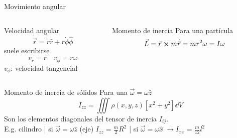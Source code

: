 \documentclass[serif]{beamer}
\begin{document}
\begin{frame}{Movimiento angular}
\begin{columns}[c]
	\begin{column}{0.45\textwidth}
		\begin{block}{Velocidad angular}
		\[
			\dot{\vec{r}} = \dot{r} \hat{r} + r \dot{\phi} \hat{\phi}
		\]
		suele escribirse
		\[ v_r = \dot{r} \quad v_\phi= r \omega \]
		\(v_\phi\): velocidad tangencial
		\end{block}
	\end{column}

	\pause

	\begin{column}{0.45\textwidth}
		\begin{block}{Momento de inercia}
			Para una partícula
			\[
				\vec{L}= \vec{r} \cp m \dot{\vec{r}} = m r^2 \omega= I \omega
			\]
		\end{block}
	\end{column}
\end{columns}
	
	\pause
	\begin{block}{Momento de inercia de sólidos}
		Para una \(\vec{\omega}= \omega \hat{z}\)
		\[
			I_{zz}= \iiint \rho(x,y,z) \left[ x^2+y^2 \right] \dd{V}
		\]
		Son los elementos diagonales del tensor de inercia \(I_{ij}\).\\
		\pause
		E.g. cilindro | si \(\vec{\omega}= \omega \hat{z}\) (eje) \(I_{zz}= \frac{m}{2}R^2\) | si \(\vec{\omega}= \omega \hat{x}\ \rightarrow I_{xx}= \frac{m}{12} l^2\)
	\end{block}

\end{frame}
\end{document}
